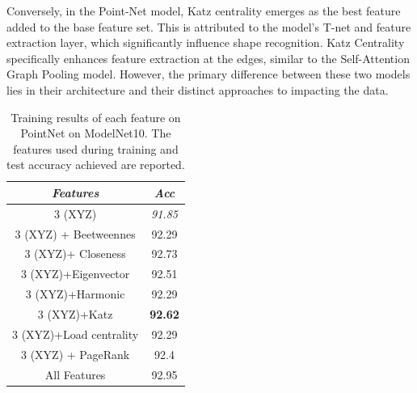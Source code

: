 \documentclass[conference]{IEEEtran}
\begin{document}
Conversely, in the Point-Net model, Katz centrality emerges as the best feature added to the base feature set.
 This is attributed to the model's T-net and feature extraction layer, which significantly influence shape recognition. 
 Katz Centrality specifically enhances feature extraction at the edges, similar to the Self-Attention Graph Pooling model.
  However, the primary difference between these two models lies in their architecture and their distinct approaches to impacting 
  the data.
  \begin{table}[t]
    
    \caption{Training results of each feature on PointNet on ModelNet10. The features used during training and test accuracy achieved are reported.}
    \begin{center}
    \begin{tabular}{|c|c|}
    \hline
      \textbf{\textit{Features}}& \textbf{\textit{Acc}} \\
    \hline
    3 (XYZ)&	\textit{91.85}\\
    \hline
    3 (XYZ) + Beetweennes&	92.29   \\
    \hline
    3 (XYZ)+ Closeness&	92.73  \\
    \hline
    3 (XYZ)+Eigenvector&	92.51 \\
    \hline
    3 (XYZ)+Harmonic&	92.29  \\
    \hline
    3 (XYZ)+Katz&\textbf{92.62}   \\
    \hline
    3 (XYZ)+Load centrality&	92.29   \\
    \hline
    3 (XYZ) + PageRank&	92.4   \\
    \hline
    All Features&	92.95   \\
    \hline

    \end{tabular}
    \label{tab2}
    
    \end{center}
    \end{table}
    
\end{document}
